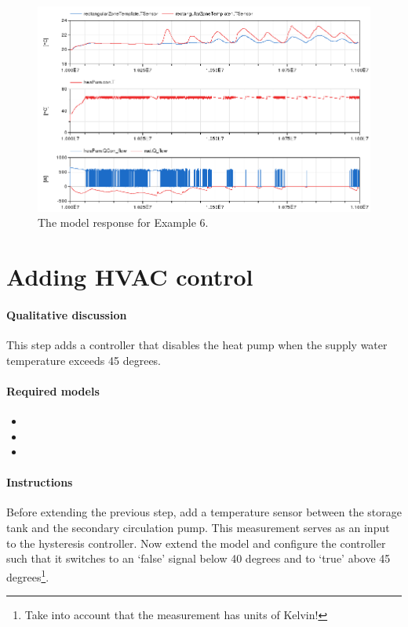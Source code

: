 \documentclass[10pt,a4paper]{article}
\begin{document}
\begin{figure}
\centering
\includegraphics[width=\linewidth]{Example6.png}
\caption{The model response for Example 6.}
\label{fig:res1}
\end{figure}


\section{Adding HVAC control}
\paragraph{Qualitative discussion}
This step adds a controller that disables the heat pump
when the supply water temperature exceeds 45 degrees.


\paragraph{Required models}
\begin{itemize}
\item {}
\item {}
\item {}
\end{itemize}

\paragraph{Instructions}
Before extending the previous step, add a temperature sensor between the storage tank
and the secondary circulation pump.
This measurement serves as an input to the hysteresis controller.
Now extend the model and configure the controller such that it switches to an `false' signal below
40 degrees and to `true' above 45 degrees\footnote{Take into account that the measurement has units of Kelvin!}.
\end{document}
